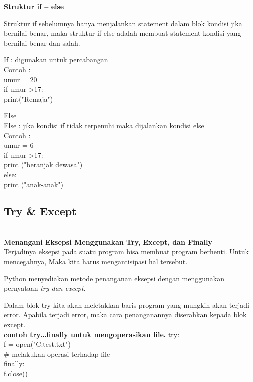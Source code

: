 \documentclass{article}
\begin{document}
    \textbf{Struktur if – else}
    \item Struktur if sebelumnya hanya menjalankan statement dalam blok kondisi jika bernilai benar, maka struktur if-else adalah membuat statement kondisi yang bernilai benar dan salah.


\item If : digunakan untuk percabangan\\
Contoh :\\
umur = 20\\
if umur \textgreater 17:\\
    print("Remaja")\\
\item Else\\
Else : jika kondisi if tidak terpenuhi maka dijalankan kondisi else\\
Contoh :\\
umur = 6\\
if umur \textgreater 17:\\
    print ("beranjak dewasa")\\
else:\\
    print ("anak-anak")\\

\subsection{Try & Except}\\
\textbf{Menangani Eksepsi Menggunakan Try, Except, dan Finally}\\

Terjadinya eksepsi pada suatu program bisa membuat program berhenti. Untuk mencegahnya, Maka kita harus mengantisipasi hal tersebut.

Python menyediakan metode penanganan eksepsi dengan menggunakan pernyataan \textit{try dan except}.

Dalam blok try kita akan meletakkan baris program yang mungkin akan terjadi error. Apabila terjadi error, maka cara penanganannya diserahkan kepada blok except. \\

\textbf{contoh try…finally untuk mengoperasikan file.} 
try:\\
    f = open("C:test.txt")\\
    # melakukan operasi terhadap file\\
finally:\\
    f.close()\\
\end{document}
